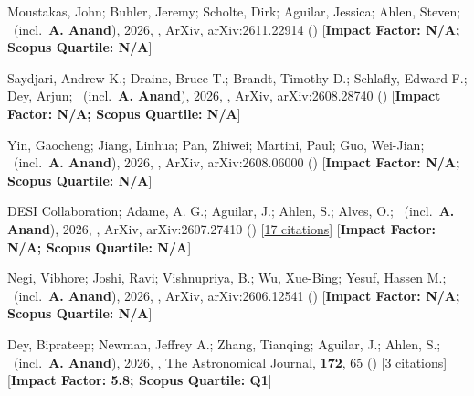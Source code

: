 \item[{\color{numcolor}\scriptsize40}] Moustakas, John; Buhler, Jeremy; Scholte, Dirk; Aguilar, Jessica; Ahlen, Steven; \etal\ (incl.\ \textbf{A. Anand}), 2026, , ArXiv, arXiv:2611.22914 () [\textbf{Impact Factor: N/A; Scopus Quartile: N/A}]

\item[{\color{numcolor}\scriptsize39}] Saydjari, Andrew K.; Draine, Bruce T.; Brandt, Timothy D.; Schlafly, Edward F.; Dey, Arjun; \etal\ (incl.\ \textbf{A. Anand}), 2026, , ArXiv, arXiv:2608.28740 () [\textbf{Impact Factor: N/A; Scopus Quartile: N/A}]

\item[{\color{numcolor}\scriptsize38}] Yin, Gaocheng; Jiang, Linhua; Pan, Zhiwei; Martini, Paul; Guo, Wei-Jian; \etal\ (incl.\ \textbf{A. Anand}), 2026, , ArXiv, arXiv:2608.06000 () [\textbf{Impact Factor: N/A; Scopus Quartile: N/A}]

\item[{\color{numcolor}\scriptsize37}] DESI Collaboration; Adame, A. G.; Aguilar, J.; Ahlen, S.; Alves, O.; \etal\ (incl.\ \textbf{A. Anand}), 2026, , ArXiv, arXiv:2607.27410 () [\href{https://ui.adsabs.harvard.edu/abs/2026arXiv260727410D}{17 citations}] [\textbf{Impact Factor: N/A; Scopus Quartile: N/A}]

\item[{\color{numcolor}\scriptsize36}] Negi, Vibhore; Joshi, Ravi; Vishnupriya, B.; Wu, Xue-Bing; Yesuf, Hassen M.; \etal\ (incl.\ \textbf{A. Anand}), 2026, , ArXiv, arXiv:2606.12541 () [\textbf{Impact Factor: N/A; Scopus Quartile: N/A}]

\item[{\color{numcolor}\scriptsize35}] Dey, Biprateep; Newman, Jeffrey A.; Zhang, Tianqing; Aguilar, J.; Ahlen, S.; \etal\ (incl.\ \textbf{A. Anand}), 2026, , The Astronomical Journal, \textbf{172}, 65 () [\href{https://ui.adsabs.harvard.edu/abs/2026AJ....172...65D}{3 citations}] [\textbf{Impact Factor: 5.8; Scopus Quartile: Q1}]

